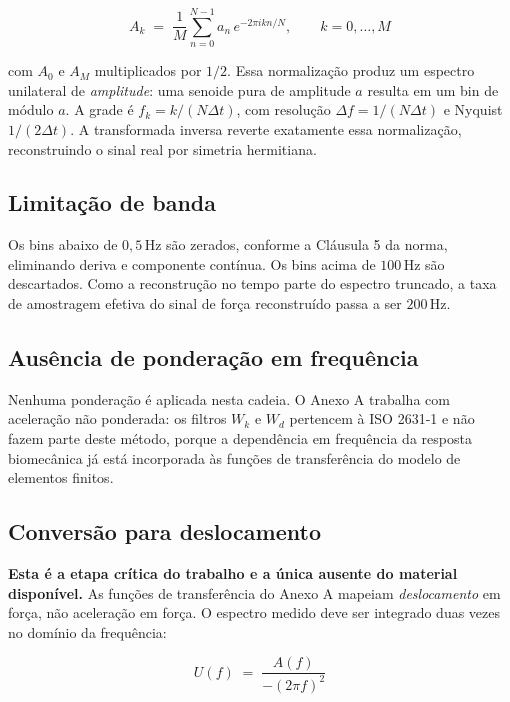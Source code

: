 \documentclass[11pt,a4paper]{article}
\newcommand{\unit}[2]{\ensuremath{#1\,\mathrm{#2}}}
\begin{document}
\begin{equation}
A_k \;=\; \frac{1}{M}\sum_{n=0}^{N-1} a_n\, e^{-2\pi i kn/N},
\qquad k = 0,\dots,M
\label{eq:fft}
\end{equation}

\noindent
com $A_0$ e $A_M$ multiplicados por $1/2$. Essa normalização produz um espectro
unilateral de \emph{amplitude}: uma senoide pura de amplitude $a$ resulta em um
bin de módulo $a$. A grade é $f_k = k/(N\Delta t)$, com resolução
$\Delta f = 1/(N\Delta t)$ e Nyquist $1/(2\Delta t)$. A transformada inversa
reverte exatamente essa normalização, reconstruindo o sinal real por simetria
hermitiana.

\subsection{Limitação de banda}

Os bins abaixo de \unit{0{,}5}{Hz} são zerados, conforme a Cláusula 5 da norma,
eliminando deriva e componente contínua. Os bins acima de \unit{100}{Hz} são
descartados. Como a reconstrução no tempo parte do espectro truncado, a taxa de
amostragem efetiva do sinal de força reconstruído passa a ser \unit{200}{Hz}.

\subsection{Ausência de ponderação em frequência}

Nenhuma ponderação é aplicada nesta cadeia. O Anexo A trabalha com aceleração
não ponderada: os filtros $W_k$ e $W_d$ pertencem à ISO 2631-1 e não fazem parte
deste método, porque a dependência em frequência da resposta biomecânica já está
incorporada às funções de transferência do modelo de elementos finitos.

\subsection{Conversão para deslocamento}
\label{sec:disp}

\textbf{Esta é a etapa crítica do trabalho e a única ausente do material
disponível.} As funções de transferência do Anexo A mapeiam \emph{deslocamento}
em força, não aceleração em força. O espectro medido deve ser integrado duas
vezes no domínio da frequência:

\begin{equation}
U(f) \;=\; \frac{A(f)}{-(2\pi f)^{2}}
\label{eq:disp}
\end{equation}
\end{document}
